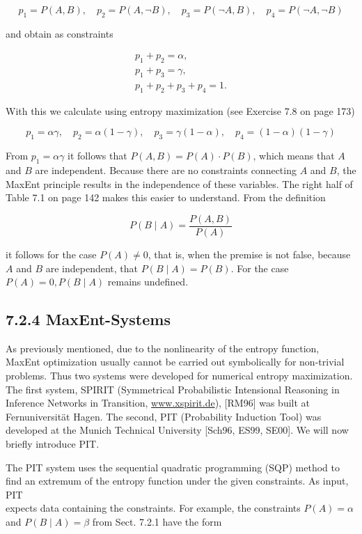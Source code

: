 \documentclass[10pt]{article}
\begin{document}
$$
p_{1}=P(A, B), \quad p_{2}=P(A, \neg B), \quad p_{3}=P(\neg A, B), \quad p_{4}=P(\neg A, \neg B)
$$

and obtain as constraints


\begin{gather*}
p_{1}+p_{2}=\alpha,  \tag{7.10}\\
p_{1}+p_{3}=\gamma,  \tag{7.11}\\
p_{1}+p_{2}+p_{3}+p_{4}=1 . \tag{7.12}
\end{gather*}


With this we calculate using entropy maximization (see Exercise 7.8 on page 173)

$$
p_{1}=\alpha \gamma, \quad p_{2}=\alpha(1-\gamma), \quad p_{3}=\gamma(1-\alpha), \quad p_{4}=(1-\alpha)(1-\gamma)
$$

From $p_{1}=\alpha \gamma$ it follows that $P(A, B)=P(A) \cdot P(B)$, which means that $A$ and $B$ are independent. Because there are no constraints connecting $A$ and $B$, the MaxEnt principle results in the independence of these variables. The right half of Table 7.1 on page 142 makes this easier to understand. From the definition

$$
P(B \mid A)=\frac{P(A, B)}{P(A)}
$$

it follows for the case $P(A) \neq 0$, that is, when the premise is not false, because $A$ and $B$ are independent, that $P(B \mid A)=P(B)$. For the case $P(A)=0, P(B \mid A)$ remains undefined.

\subsection*{7.2.4 MaxEnt-Systems}
As previously mentioned, due to the nonlinearity of the entropy function, MaxEnt optimization usually cannot be carried out symbolically for non-trivial problems. Thus two systems were developed for numerical entropy maximization. The first system, SPIRIT (Symmetrical Probabilistic Intensional Reasoning in Inference Networks in Transition, \href{http://www.xspirit.de}{www.xspirit.de}), [RM96] was built at Fernuniversität Hagen. The second, PIT (Probability Induction Tool) was developed at the Munich Technical University [Sch96, ES99, SE00]. We will now briefly introduce PIT.

The PIT system uses the sequential quadratic programming (SQP) method to find an extremum of the entropy function under the given constraints. As input, PIT\\
expects data containing the constraints. For example, the constraints $P(A)=\alpha$ and $P(B \mid A)=\beta$ from Sect. 7.2.1 have the form
\end{document}
